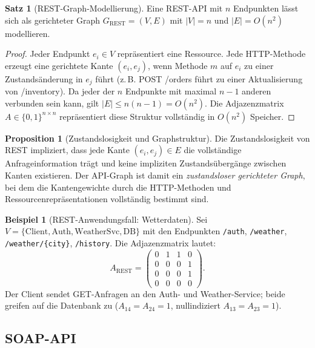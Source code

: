 ﻿\documentclass[a4paper,12pt]{article}
\theoremstyle{definition}
\newtheorem{beispiel}{Beispiel}
\newtheorem{satz}{Satz}
\newtheorem{proposition}{Proposition}
\begin{document}
\begin{satz}[REST-Graph-Modellierung]
  Eine REST-API mit $n$ Endpunkten lässt sich als gerichteter Graph
  $G_{\mathrm{REST}} = (V, E)$ mit $|V| = n$ und $|E| = O(n^2)$ modellieren.
\end{satz}

\begin{proof}
  Jeder Endpunkt $e_i \in V$ repräsentiert eine Ressource. Jede HTTP-Methode
  erzeugt eine gerichtete Kante $(e_i, e_j)$, wenn Methode $m$ auf $e_i$
  zu einer Zustandsänderung in $e_j$ führt (z.\,B. POST /orders führt zu
  einer Aktualisierung von /inventory). Da jeder der $n$ Endpunkte mit maximal
  $n-1$ anderen verbunden sein kann, gilt $|E| \leq n(n-1) = O(n^2)$. Die
  Adjazenzmatrix $A \in \{0,1\}^{n \times n}$ repräsentiert diese Struktur
  vollständig in $O(n^2)$ Speicher.
\end{proof}

\begin{proposition}[Zustandslosigkeit und Graphstruktur]
  Die Zustandslosigkeit von REST impliziert, dass jede Kante $(e_i, e_j) \in E$
  die vollständige Anfrageinformation trägt und keine impliziten Zustandsübergänge
  zwischen Kanten existieren. Der API-Graph ist damit ein \emph{zustandsloser
  gerichteter Graph}, bei dem die Kantengewichte durch die HTTP-Methoden und
  Ressourcenrepräsentationen vollständig bestimmt sind.
\end{proposition}

\begin{beispiel}[REST-Anwendungsfall: Wetterdaten]
  Sei $V = \{\mathrm{Client}, \mathrm{Auth}, \mathrm{WeatherSvc}, \mathrm{DB}\}$
  mit den Endpunkten \texttt{/auth}, \texttt{/weather}, \texttt{/weather/\{city\}},
  \texttt{/history}. Die Adjazenzmatrix lautet:
  \[
    A_{\mathrm{REST}} = \begin{pmatrix}
      0 & 1 & 1 & 0 \\
      0 & 0 & 0 & 1 \\
      0 & 0 & 0 & 1 \\
      0 & 0 & 0 & 0
    \end{pmatrix}.
  \]
  Der Client sendet GET-Anfragen an den Auth- und Weather-Service;
  beide greifen auf die Datenbank zu ($A_{14} = A_{24} = 1$, nullindiziert $A_{13}=A_{23}=1$).
\end{beispiel}

\subsection{SOAP-API}
\end{document}

